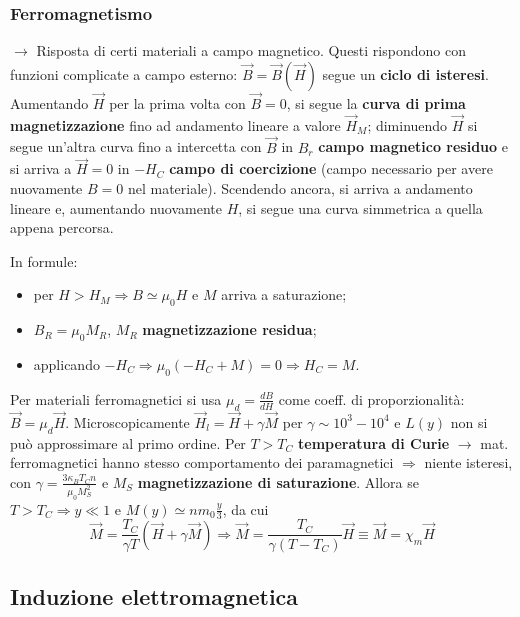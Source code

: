 \documentclass[a4paper]{scrartcl}
\numberwithin{equation}{subsection}
\theoremstyle{style1}
\begin{document}
\subsubsection{Ferromagnetismo}
$\to$ Risposta di certi materiali a campo magnetico. Questi rispondono con funzioni complicate a campo esterno: $\vec{B}=\vec{B}(\vec{H})$ segue un \textbf{ciclo di isteresi}. Aumentando $\vec{H}$ per la prima volta con $\vec{B} =0 $, si segue la \textbf{curva di prima magnetizzazione} fino ad andamento lineare a valore $\vec{H}_M$; diminuendo $\vec{H}$ si segue un'altra curva fino a intercetta con $\vec{B}$ in $B_r$ \textbf{campo magnetico residuo} e si arriva a $\vec{H}=0$ in $-H_C$ \textbf{campo di coercizione} (campo necessario per avere nuovamente $B=0$ nel materiale). Scendendo ancora, si arriva a andamento lineare e, aumentando nuovamente $H$, si segue una curva simmetrica a quella appena percorsa. 

In formule:
\begin{itemize}
	\item per $H>H_M\Rightarrow B\simeq \mu_0 H$ e $M$ arriva a saturazione;
	\item $B_R = \mu_0 M_R$, $M_R$ \textbf{magnetizzazione residua};
	\item applicando $-H_C\Rightarrow \mu_0 (-H_C + M) = 0\Rightarrow H_C = M$.
\end{itemize}
Per materiali ferromagnetici si usa $\mu _d = \frac{d B}{d H} $ come coeff. di proporzionalit\`a: $\vec{B} = \mu _d\vec{H}$. Microscopicamente $\vec{H}_l = \vec{H} + \gamma\vec{M}$ per $\gamma\sim 10^3 - 10^4$ e $L(y)$ non si pu\`o approssimare al primo ordine. Per $T>T_C$ \textbf{temperatura di Curie} $\to$ mat. ferromagnetici hanno stesso comportamento dei paramagnetici $\Rightarrow $ niente isteresi, con $\gamma = \frac{3\kappa _B T_C n}{\mu_0 M_S^2}$ e $M_S$ \textbf{magnetizzazione di saturazione}. Allora se $T>T_C\Rightarrow y\ll 1$ e $M(y) \simeq nm_0 \frac{y}{3}$, da cui
\begin{equation}
	\vec{M} = \frac{T_C}{\gamma T} (\vec{H}+ \gamma \vec{M}) \Rightarrow  \vec{M} = \frac{T_C}{\gamma(T-T_C)}\vec{H}\equiv \vec{M}=\chi _m \vec{H}
\end{equation}
\subsection{Induzione elettromagnetica}
\end{document}
